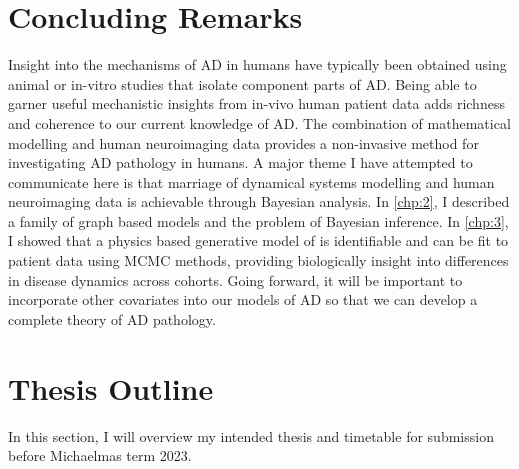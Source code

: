 \section{Concluding Remarks} 
Insight into the mechanisms of AD in humans have typically been obtained using
animal or in-vitro studies that isolate component parts of AD. Being able to
garner useful mechanistic insights from in-vivo human patient data adds richness
and coherence to our current knowledge of AD. The combination of mathematical
modelling and human neuroimaging data provides a non-invasive method for
investigating AD pathology in humans. A major theme I have attempted to
communicate here is that marriage of dynamical systems modelling and human
neuroimaging data is achievable through Bayesian analysis. In \cref{chp:2}, I
described a family of graph based models and the problem of Bayesian inference.
In \cref{chp:3}, I showed that a physics based generative model of \TP is
identifiable and can be fit to patient data using MCMC methods, providing
biologically insight into differences in disease dynamics across cohorts. Going 
forward, it will be important to incorporate other covariates into our models of 
AD so that we can develop a complete theory of AD pathology.

\section{Thesis Outline}

In this section, I will overview my intended thesis and timetable for submission 
before Michaelmas term 2023. 

